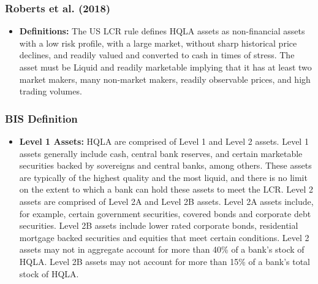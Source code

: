 \documentclass{beamer}
\begin{document}
\begin{frame}
\frametitle{Roberts et al. (2018)}
\begin{itemize}
	\item \textbf{Definitions:} The US LCR rule defines HQLA assets as non-financial assets with a low risk profile, with a large market, without sharp historical price declines, and readily valued and converted to cash in times of stress. The asset must be Liquid and readily marketable implying that it has at least two market makers, many non-market makers, readily observable prices, and high trading volumes. 
	


\end{itemize}
\end{frame}

\begin{frame}
\frametitle{BIS Definition
}
\begin{itemize}
	\item \textbf{Level 1 Assets:} HQLA are comprised of Level 1 and Level 2 assets. Level 1 assets generally include cash, central bank reserves, and certain marketable securities backed by sovereigns and central banks, among others. These assets are typically of the highest quality and the most liquid, and there is no limit on the extent to which a bank can hold these assets to meet the LCR. Level 2 assets are comprised of Level 2A and Level 2B assets. Level 2A assets include, for example, certain government securities, covered bonds and corporate debt securities. Level 2B assets include lower rated corporate bonds, residential mortgage backed securities and equities that meet certain conditions. Level 2 assets may not in aggregate account for more than 40\% of a bank’s stock of HQLA. Level 2B assets may not account for more than 15\% of a bank’s total stock of HQLA.

\end{itemize}
\end{frame}
\end{document}
